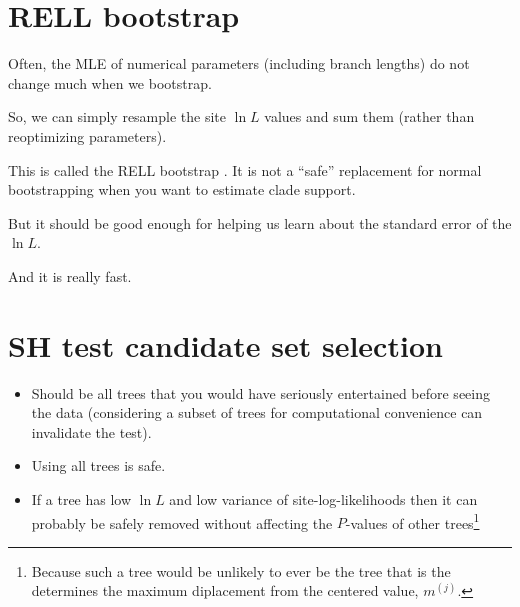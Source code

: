  


\myNewSlide
\section*{RELL bootstrap}
\large
Often, the MLE of numerical parameters (including branch lengths) do not change much when we bootstrap.

So, we can simply resample the site $\ln L$ values and sum them (rather than reoptimizing parameters).

This is called the RELL bootstrap \citep[][and Felsenstein]{KishinoMH1990}. It is not a ``safe'' replacement for normal bootstrapping \citep[especially on large trees;][]{StamatakisHR2008} when you want to estimate clade support.

But it should be good enough for helping us learn about the standard error of the $\ln L$.

And it is really fast.




\myNewSlide
\section*{SH test candidate set selection}
\large
\begin{itemize}
    \item Should be all trees that you would have seriously entertained before seeing the data (considering a subset of trees for computational convenience can invalidate the test).
    \item Using all trees is safe.
    \item If a tree has low $\ln L$ and low variance of site-log-likelihoods then it can probably be safely removed without affecting the $P$-values of other trees\footnote{Because such a tree would be unlikely to ever be the tree that is the determines the maximum diplacement from the centered value, $m^{(j)}$.}
\end{itemize}

